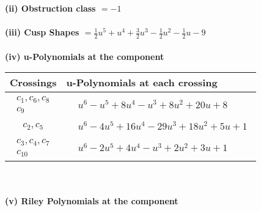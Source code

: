 \documentclass[1p]{elsarticle_modified}
\theoremstyle{definition}
\begin{document}
\flushleft \textbf{(ii) Obstruction class $= -1$}\\~\\
\flushleft \textbf{(iii) Cusp Shapes $= \frac{1}{2} u^5+u^4+\frac{3}{2} u^3-\frac{1}{2} u^2-\frac{1}{2} u-9$}\\~\\
\newpage\renewcommand{\arraystretch}{1}
\flushleft \textbf{(iv) u-Polynomials at the component}\newline \\
\begin{tabular}{m{50pt}|m{274pt}}
Crossings & \hspace{64pt}u-Polynomials at each crossing \\
\hline $$\begin{aligned}c_{1},c_{6},c_{8}\\c_{9}\end{aligned}$$&$\begin{aligned}
&u^6- u^5+8 u^4- u^3+8 u^2+20 u+8
\end{aligned}$\\
\hline $$\begin{aligned}c_{2},c_{5}\end{aligned}$$&$\begin{aligned}
&u^6-4 u^5+16 u^4-29 u^3+18 u^2+5 u+1
\end{aligned}$\\
\hline $$\begin{aligned}c_{3},c_{4},c_{7}\\c_{10}\end{aligned}$$&$\begin{aligned}
&u^6-2 u^5+4 u^4- u^3+2 u^2+3 u+1
\end{aligned}$\\
\hline
\end{tabular}\\~\\
\newpage\renewcommand{\arraystretch}{1}
\flushleft \textbf{(v) Riley Polynomials at the component}\newline \\
\end{document}
